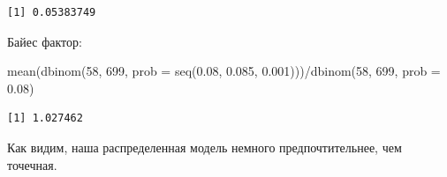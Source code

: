 \documentclass[
]{book}
\newenvironment{Shaded}{\begin{snugshade}}{\end{snugshade}}
\newcommand{\AttributeTok}[1]{\textcolor[rgb]{0.77,0.63,0.00}{#1}}
\newcommand{\DecValTok}[1]{\textcolor[rgb]{0.00,0.00,0.81}{#1}}
\newcommand{\FloatTok}[1]{\textcolor[rgb]{0.00,0.00,0.81}{#1}}
\newcommand{\FunctionTok}[1]{\textcolor[rgb]{0.00,0.00,0.00}{#1}}
\newcommand{\NormalTok}[1]{#1}
\newcommand{\SpecialCharTok}[1]{\textcolor[rgb]{0.00,0.00,0.00}{#1}}
\begin{document}
\begin{verbatim}
[1] 0.05383749
\end{verbatim}

Байес фактор:

\begin{Shaded}
\begin{Highlighting}[]
\FunctionTok{mean}\NormalTok{(}\FunctionTok{dbinom}\NormalTok{(}\DecValTok{58}\NormalTok{, }\DecValTok{699}\NormalTok{, }\AttributeTok{prob =} \FunctionTok{seq}\NormalTok{(}\FloatTok{0.08}\NormalTok{, }\FloatTok{0.085}\NormalTok{, }\FloatTok{0.001}\NormalTok{)))}\SpecialCharTok{/}\FunctionTok{dbinom}\NormalTok{(}\DecValTok{58}\NormalTok{, }\DecValTok{699}\NormalTok{, }\AttributeTok{prob =} \FloatTok{0.08}\NormalTok{)}
\end{Highlighting}
\end{Shaded}

\begin{verbatim}
[1] 1.027462
\end{verbatim}

Как видим, наша распределенная модель немного предпочтительнее, чем точечная.

  
\end{document}
